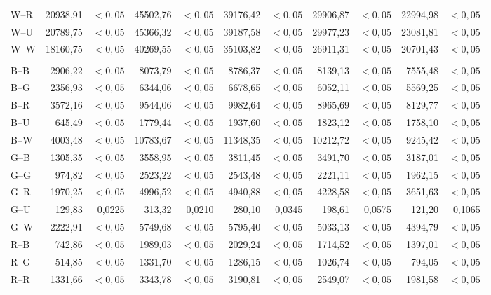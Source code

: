 {\begin{longtable}{@{}lrrrrrrrrrr@{}}
W--R & 20938,91 & $<0{,}05$ & 45502,76 & $<0{,}05$ & 39176,42 & $<0{,}05$ & 29906,87 & $<0{,}05$ & 22994,98 & $<0{,}05$ \\
W--U & 20789,75 & $<0{,}05$ & 45366,32 & $<0{,}05$ & 39187,58 & $<0{,}05$ & 29977,23 & $<0{,}05$ & 23081,81 & $<0{,}05$ \\
W--W & 18160,75 & $<0{,}05$ & 40269,55 & $<0{,}05$ & 35103,82 & $<0{,}05$ & 26911,31 & $<0{,}05$ & 20701,43 & $<0{,}05$ \\
\addlinespace[2pt]
\multicolumn{11}{l}{\textbf{Floresta vs. Savana}}\\
B--B & 2906,22 & $<0{,}05$ & 8073,79 & $<0{,}05$ & 8786,37 & $<0{,}05$ & 8139,13 & $<0{,}05$ & 7555,48 & $<0{,}05$ \\
B--G & 2356,93 & $<0{,}05$ & 6344,06 & $<0{,}05$ & 6678,65 & $<0{,}05$ & 6052,11 & $<0{,}05$ & 5569,25 & $<0{,}05$ \\
B--R & 3572,16 & $<0{,}05$ & 9544,06 & $<0{,}05$ & 9982,64 & $<0{,}05$ & 8965,69 & $<0{,}05$ & 8129,77 & $<0{,}05$ \\
B--U & 645,49 & $<0{,}05$ & 1779,44 & $<0{,}05$ & 1937,60 & $<0{,}05$ & 1823,12 & $<0{,}05$ & 1758,10 & $<0{,}05$ \\
B--W & 4003,48 & $<0{,}05$ & 10783,67 & $<0{,}05$ & 11348,35 & $<0{,}05$ & 10212,72 & $<0{,}05$ & 9245,42 & $<0{,}05$ \\
G--B & 1305,35 & $<0{,}05$ & 3558,95 & $<0{,}05$ & 3811,45 & $<0{,}05$ & 3491,70 & $<0{,}05$ & 3187,01 & $<0{,}05$ \\
G--G & 974,82 & $<0{,}05$ & 2523,22 & $<0{,}05$ & 2543,48 & $<0{,}05$ & 2221,11 & $<0{,}05$ & 1962,15 & $<0{,}05$ \\
G--R & 1970,25 & $<0{,}05$ & 4996,52 & $<0{,}05$ & 4940,88 & $<0{,}05$ & 4228,58 & $<0{,}05$ & 3651,63 & $<0{,}05$ \\
G--U & 129,83 & 0,0225 & 313,32 & 0,0210 & 280,10 & 0,0345 & 198,61 & 0,0575 & 121,20 & 0,1065 \\
G--W & 2222,91 & $<0{,}05$ & 5749,68 & $<0{,}05$ & 5795,40 & $<0{,}05$ & 5033,13 & $<0{,}05$ & 4394,79 & $<0{,}05$ \\
R--B & 742,86 & $<0{,}05$ & 1989,03 & $<0{,}05$ & 2029,24 & $<0{,}05$ & 1714,52 & $<0{,}05$ & 1397,01 & $<0{,}05$ \\
R--G & 514,85 & $<0{,}05$ & 1331,70 & $<0{,}05$ & 1286,15 & $<0{,}05$ & 1026,74 & $<0{,}05$ & 794,05 & $<0{,}05$ \\
R--R & 1331,66 & $<0{,}05$ & 3343,78 & $<0{,}05$ & 3190,81 & $<0{,}05$ & 2549,07 & $<0{,}05$ & 1981,58 & $<0{,}05$ \\

\end{longtable}}
